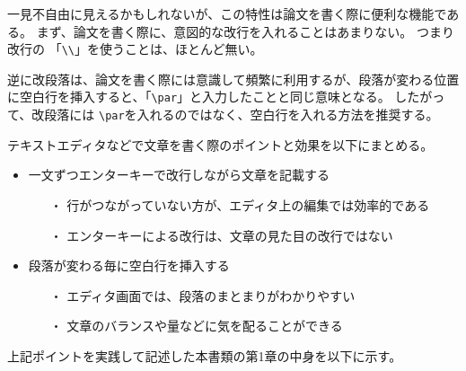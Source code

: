 一見不自由に見えるかもしれないが、この特性は論文を書く際に便利な機能である。
まず、論文を書く際に、意図的な改行を入れることはあまりない。
つまり改行の 「\verb+\\+」を使うことは、ほとんど無い。

逆に改段落は、論文を書く際には意識して頻繁に利用するが、段落が変わる位置に空白行を挿入すると、「\verb+\par+」と入力したことと同じ意味となる。
したがって、改段落には \verb+\par+を入れるのではなく、空白行を入れる方法を推奨する。

テキストエディタなどで文章を書く際のポイントと効果を以下にまとめる。
\begin{itemize}
\item 一文ずつエンターキーで改行しながら文章を記載する
\begin{itemize}
\item[・] 行がつながっていない方が、エディタ上の編集では効率的である
\item[・] エンターキーによる改行は、文章の見た目の改行ではない
\end{itemize}
\item 段落が変わる毎に空白行を挿入する
\begin{itemize}
\item[・] エディタ画面では、段落のまとまりがわかりやすい
\item[・] 文章のバランスや量などに気を配ることができる
\end{itemize}
\end{itemize}
上記ポイントを実践して記述した本書類の第1章の中身を以下に示す。

